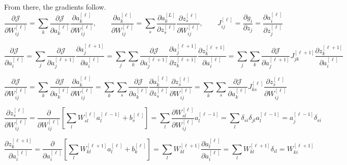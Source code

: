 \documentclass[a4paper, 12pt]{report}
\begin{document}
From there, the gradients follow.
\begin{equation}
\frac{\partial\mathcal J}{\partial W^{[\ell]}_{ij}} = \sum_k\frac{\partial\mathcal J}{\partial a^{[\ell]}_{k}}\frac{\partial a^{[\ell]}_{k}}{\partial W^{[\ell]}_{ij}},\quad\quad
\frac{\partial a^{[\ell]}_{k}}{\partial W^{[\ell]}_{ij}} = \sum_s\frac{\partial a^{[L]}_{k}}{\partial z^{[\ell]}_s}\frac{\partial z^{[\ell]}_s}{\partial W^{[\ell]}_{ij}},\quad\quad
J^{[\ell]}_{ij} = \frac{\partial g_i}{\partial z_j} = \frac{\partial a^{[\ell]}_{i}}{\partial z^{[\ell]}_j}
\end{equation}

\begin{equation}
\frac{\partial\mathcal J}{\partial a^{[\ell]}_i}
=\sum_j\frac{\partial\mathcal J}{\partial a^{[\ell+1]}_j}\frac{\partial a^{[\ell+1]}_j}{\partial a^{[\ell]}_i}
=\sum_j\sum_k\frac{\partial\mathcal J}{\partial a^{[\ell+1]}_j}\frac{\partial a^{[\ell+1]}_j}{\partial z^{[\ell+1]}_k}\frac{\partial z^{[\ell+1]}_k}{\partial a^{[\ell]}_i}
=\sum_j\sum_k\frac{\partial\mathcal J}{\partial a^{[\ell+1]}_j}J^{[\ell+1]}_{jk}\frac{\partial z^{[\ell+1]}_k}{\partial a^{[\ell]}_i}
\end{equation}

\begin{equation}
\frac{\partial\mathcal J}{\partial W^{[\ell]}_{ij}} 
= \sum_k\frac{\partial\mathcal J}{\partial a^{[\ell]}_{k}}\frac{\partial a^{[\ell]}_{k}}{\partial W^{[\ell]}_{ij}}
= \sum_k\sum_s\frac{\partial\mathcal J}{\partial a^{[\ell]}_{k}}\frac{\partial a^{[\ell]}_{k}}{\partial z^{[\ell]}_s}\frac{\partial z^{[\ell]}_s}{\partial W^{[\ell]}_{ij}}
= \sum_k\sum_s\frac{\partial\mathcal J}{\partial a^{[\ell]}_{k}}J^{[\ell]}_{ks}\frac{\partial z^{[\ell]}_s}{\partial W^{[\ell]}_{ij}}
\end{equation}

\begin{equation}
\frac{\partial z_s^{[\ell]}}{\partial W^{[\ell]}_{ij}}
=\frac{\partial}{\partial W^{[\ell]}_{ij}}\left[\sum_l W^{[\ell]}_{sl} a^{[\ell-1]}_{l}+b^{[\ell]}_s\right]
=\sum_l\frac{\partial W^{[\ell]}_{sl}}{\partial W^{[\ell]}_{ij}} a^{[\ell-1]}_{l}
= \sum_l\delta_{si}\delta_{jl} a^{[\ell-1]}_{l} = a^{[\ell-1]}_j\delta_{si}
\end{equation}

\begin{equation}
\frac{\partial z^{[\ell+1]}_k}{\partial a^{[\ell]}_i}
= \frac{\partial}{\partial a^{[\ell]}_i}\left[\sum_l W^{[\ell+1]}_{kl} a^{[\ell]}_l + b^{[\ell]}_k\right]
= \sum_l W_{kl}^{[\ell+1]}\frac{\partial a_l^{[\ell]}}{\partial a_i^{[\ell]}}
= \sum_l W_{kl}^{[\ell+1]}\delta_{il}
= W_{ki}^{[\ell+1]}
\end{equation}
\end{document}

